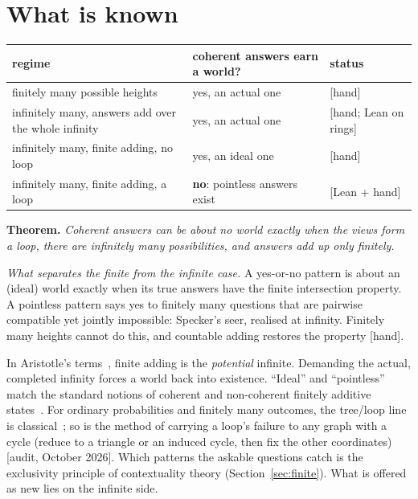 \documentclass[11pt]{article}
\newcommand{\st}[1]{\textsf{\small[#1]}}
\begin{document}
\section{What is known}
\begin{center}\small
\begin{tabular}{|>{\raggedright\arraybackslash}p{6.4cm}|>{\raggedright\arraybackslash}p{4.4cm}|>{\raggedright\arraybackslash}p{2.6cm}|}
\hline
\textbf{regime} & \textbf{coherent answers earn a world?} & \textbf{status}\\\hline
finitely many possible heights & yes, an actual one & \st{hand}\\
infinitely many, answers add over the whole infinity & yes, an actual one & \st{hand; Lean on rings}\\
infinitely many, finite adding, no loop & yes, an ideal one & \st{hand}\\
infinitely many, finite adding, a loop & \textbf{no}: pointless answers exist & \st{Lean + hand}\\\hline
\end{tabular}
\end{center}

\noindent\textbf{Theorem.} \emph{Coherent answers can be about no world exactly
when the views form a loop, there are infinitely many possibilities, and answers
add up only finitely.}

\medskip
\noindent\emph{What separates the finite from the infinite case.} A yes-or-no
pattern is about an (ideal) world exactly when its true answers have the finite
intersection property. A pointless pattern says yes to finitely many questions
that are pairwise compatible yet jointly impossible: Specker's seer, realised at
infinity. Finitely many heights cannot do this, and countable adding restores
the property \st{hand}.

\medskip
\noindent In Aristotle's terms~\cite{aristotle}, finite adding is the
\emph{potential} infinite. Demanding the actual, completed infinity forces a world
back into existence. ``Ideal'' and ``pointless'' match the standard notions of
coherent and non-coherent finitely additive states~\cite{bhaskararao1983}. For
ordinary probabilities and finitely many outcomes, the tree/loop line is
classical~\cite{vorobev1962,bfmy1983}; so is the method of carrying a loop's
failure to any graph with a cycle (reduce to a triangle or an induced cycle, then fix the
other coordinates)~\cite{atseriaskolaitis2020} \st{audit, October 2026}. Which patterns the askable questions
catch is the exclusivity principle of contextuality theory
(Section~\ref{sec:finite}). What is offered as new lies on the infinite side.
\end{document}
